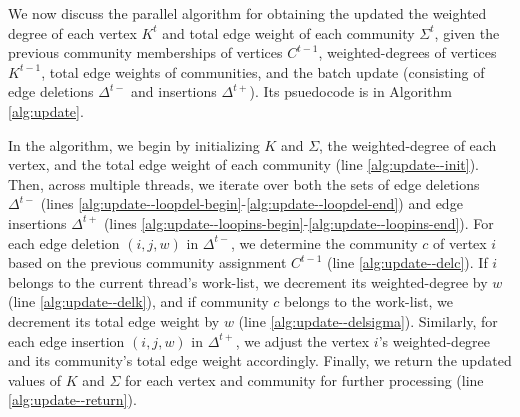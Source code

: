 We now discuss the parallel algorithm for obtaining the updated the weighted degree of each vertex $K^t$ and total edge weight of each community $\Sigma^t$, given the previous community memberships of vertices $C^{t-1}$, weighted-degrees of vertices $K^{t-1}$, total edge weights of communities, and the batch update (consisting of edge deletions $\Delta^{t-}$ and insertions $\Delta^{t+}$). Its psuedocode is in Algorithm \ref{alg:update}.



In the algorithm, we begin by initializing $K$ and $\Sigma$, the weighted-degree of each vertex, and the total edge weight of each community (line \ref{alg:update--init}). Then, across multiple threads, we iterate over both the sets of edge deletions $\Delta^{t-}$ (lines \ref{alg:update--loopdel-begin}-\ref{alg:update--loopdel-end}) and edge insertions $\Delta^{t+}$ (lines \ref{alg:update--loopins-begin}-\ref{alg:update--loopins-end}). For each edge deletion $(i, j, w)$ in $\Delta^{t-}$, we determine the community $c$ of vertex $i$ based on the previous community assignment $C^{t-1}$ (line \ref{alg:update--delc}). If $i$ belongs to the current thread's work-list, we decrement its weighted-degree by $w$ (line \ref{alg:update--delk}), and if community $c$ belongs to the work-list, we decrement its total edge weight by $w$ (line \ref{alg:update--delsigma}). Similarly, for each edge insertion $(i, j, w)$ in $\Delta^{t+}$, we adjust the vertex $i$'s weighted-degree and its community's total edge weight accordingly. Finally, we return the updated values of $K$ and $\Sigma$ for each vertex and community for further processing (line \ref{alg:update--return}).

